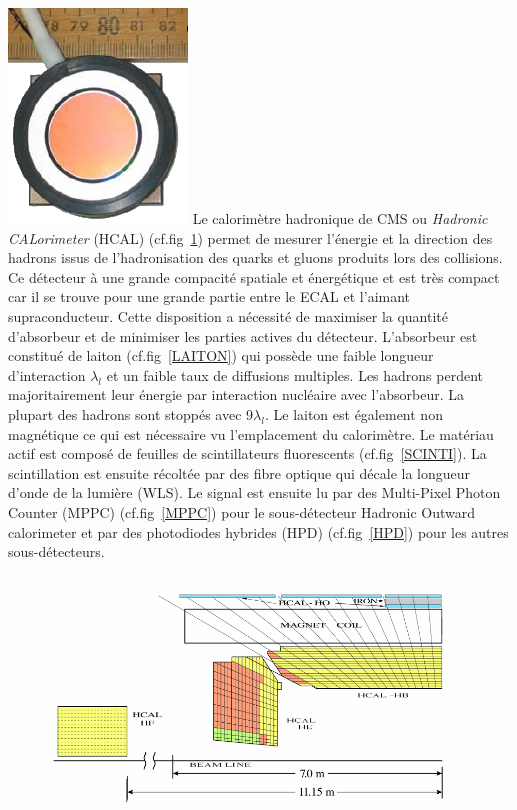 \marginpar
{
	\centering
	\includegraphics[width=\marginparwidth]{CMS/HPD.png}
	\label{HPD}
}
Le calorimètre hadronique de CMS ou \textit{Hadronic CALorimeter} (HCAL) (cf.fig~\ref{HCAL}) permet de mesurer l'énergie et la direction des hadrons issus de l'hadronisation des quarks et gluons produits lors des collisions. Ce détecteur à une grande compacité spatiale et énergétique et est très compact car il se trouve pour une grande partie entre le ECAL et l'aimant supraconducteur. Cette disposition a nécessité de maximiser la quantité d'absorbeur et de minimiser les parties actives du détecteur. L'absorbeur est constitué de laiton (cf.fig~\ref{LAITON}) qui possède une faible longueur d'interaction $\lambda_{l}$ et un faible taux de diffusions multiples. Les hadrons perdent majoritairement leur énergie par interaction nucléaire avec l'absorbeur. La plupart des hadrons sont stoppés avec 9$\lambda_{l}$. Le laiton est également non magnétique ce qui est nécessaire vu l'emplacement du calorimètre. Le matériau actif est composé de feuilles de scintillateurs fluorescents (cf.fig~\ref{SCINTI}). La scintillation est ensuite récoltée par des fibre optique qui décale la longueur d'onde de la lumière (WLS). Le signal est ensuite lu par des Multi-Pixel Photon Counter (MPPC) (cf.fig~\ref{MPPC}) pour le sous-détecteur Hadronic Outward calorimeter et par des photodiodes hybrides (HPD) (cf.fig~\ref{HPD}) pour les autres sous-détecteurs.
\begin{figure}[ht!]
	\centering
	\includegraphics[width=0.95\textwidth]{CMS/HCALSCHEME.png}
	\label{HCAL}
\end{figure}

